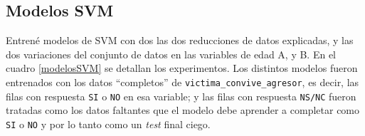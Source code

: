 \documentclass[10 pt]{article}
\begin{document}
\subsection{Modelos SVM}\label{svm}


Entrené modelos de SVM con dos las dos reducciones de datos explicadas, y las dos variaciones del conjunto de datos en las variables de edad A, y B. En el cuadro \ref{modelosSVM} se detallan los experimentos. Los distintos modelos fueron entrenados con los datos “completos” de \texttt{victima\_convive\_agresor}, es decir, las filas con respuesta \texttt{SI} o \texttt{NO} en esa variable; y las filas con respuesta \texttt{NS/NC} fueron tratadas como los datos faltantes que el modelo debe aprender a completar como \texttt{SI} o \texttt{NO} y por lo tanto como un \textit{test} final ciego.   
\end{document}
